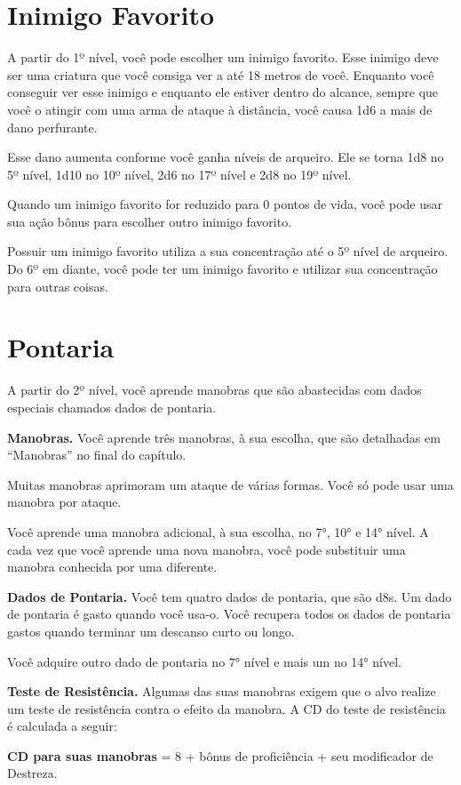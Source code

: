 \begin{multicols}{2}
\section*{Inimigo Favorito}%

A partir do 1º nível, você pode escolher um inimigo favorito. Esse inimigo deve
ser uma criatura que você consiga ver a até 18 metros de você. Enquanto você
conseguir ver esse inimigo e enquanto ele estiver dentro do alcance, sempre que
você o atingir com uma arma de ataque à distância, você causa 1d6 a mais de
dano perfurante.

Esse dano aumenta conforme você ganha níveis de arqueiro. Ele se torna 1d8 no
5º nível, 1d10 no 10º nível, 2d6 no 17º nível e 2d8 no 19º nível.

Quando um inimigo favorito for reduzido para 0 pontos de vida, você pode usar
sua ação bônus para escolher outro inimigo favorito.

Possuir um inimigo favorito utiliza a sua concentração até o 5º nível de
arqueiro. Do 6º em diante, você pode ter um inimigo favorito e utilizar sua
concentração para outras coisas.

\section*{Pontaria}%

A partir do 2º nível, você aprende manobras que são abastecidas com dados
especiais chamados dados de pontaria.

\textbf{Manobras.} Você aprende três manobras, à sua escolha, que são detalhadas
em ``Manobras'' no final do capítulo.

Muitas manobras aprimoram um ataque de várias formas. Você só pode usar uma
manobra por ataque.

Você aprende uma manobra adicional, à sua escolha, no 7°, 10° e 14° nível. A
cada vez que você aprende uma nova manobra, você pode substituir uma manobra
conhecida por uma diferente.

\textbf{Dados de Pontaria.} Você tem quatro dados de pontaria, que são d8s. Um
dado de pontaria é gasto quando você usa-o. Você recupera todos os dados de
pontaria gastos quando terminar um descanso curto ou longo.

Você adquire outro dado de pontaria no 7° nível e mais um no 14° nível.

\textbf{Teste de Resistência.} Algumas das suas manobras exigem que o alvo
realize um teste de resistência contra o efeito da manobra. A CD do teste de
resistência é calculada a seguir:
\begin{center}
\textbf{CD para suas manobras} = 8 + bônus de proficiência + seu modificador de
Destreza.
\end{center}


\end{multicols}
